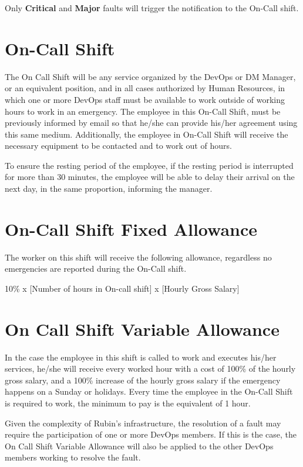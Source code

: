 Only \textbf{Critical} and \textbf{Major} faults will trigger the notification to the On-Call shift. 


\section{On-Call Shift}

The On Call Shift will be any service organized by the DevOps or DM Manager, or an equivalent position, and in all cases authorized by Human Resources, in which one or more DevOps staff must be available to work outside of working hours to work in an emergency. 
The employee in this On-Call Shift, must be previously informed by email so that he/she can provide his/her agreement using this same medium. Additionally, the employee in On-Call Shift will receive the necessary equipment to be contacted and to work out of hours. 

To ensure the resting period of the employee, if the resting period is interrupted for more than 30 minutes, the employee will be able to delay their arrival on the next day, in the same proportion, informing the manager.

\section{On-Call Shift Fixed Allowance}

The worker on this shift will receive the following allowance, regardless no emergencies are reported during the On-Call shift.

10\% x [Number of hours in On-call shift] x [Hourly Gross Salary]


\section{On Call Shift Variable Allowance}

In the case the employee in this shift is called to work and executes his/her services, he/she will receive every worked hour with a cost of 100\% of the hourly gross salary, and a 100\% increase of the hourly gross salary if the emergency happens on a Sunday or holidays. Every time the employee in the On-Call Shift is required to work, the minimum to pay is the equivalent of 1 hour. 

Given the complexity of Rubin’s infrastructure, the resolution of a fault may require the participation of one or more DevOps members. If this is the case, the On Call Shift Variable Allowance will also be applied to the other DevOps members working to resolve the fault. 

